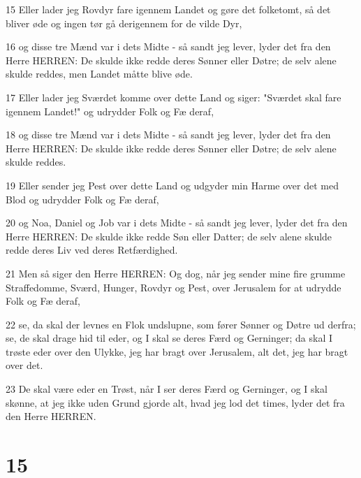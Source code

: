 \par 15 Eller lader jeg Rovdyr fare igennem Landet og gøre det folketomt, så det bliver øde og ingen tør gå derigennem for de vilde Dyr,
\par 16 og disse tre Mænd var i dets Midte - så sandt jeg lever, lyder det fra den Herre HERREN: De skulde ikke redde deres Sønner eller Døtre; de selv alene skulde reddes, men Landet måtte blive øde.
\par 17 Eller lader jeg Sværdet komme over dette Land og siger: "Sværdet skal fare igennem Landet!" og udrydder Folk og Fæ deraf,
\par 18 og disse tre Mænd var i dets Midte - så sandt jeg lever, lyder det fra den Herre HERREN: De skulde ikke redde deres Sønner eller Døtre; de selv alene skulde reddes.
\par 19 Eller sender jeg Pest over dette Land og udgyder min Harme over det med Blod og udrydder Folk og Fæ deraf,
\par 20 og Noa, Daniel og Job var i dets Midte - så sandt jeg lever, lyder det fra den Herre HERREN: De skulde ikke redde Søn eller Datter; de selv alene skulde redde deres Liv ved deres Retfærdighed.
\par 21 Men så siger den Herre HERREN: Og dog, når jeg sender mine fire grumme Straffedomme, Sværd, Hunger, Rovdyr og Pest, over Jerusalem for at udrydde Folk og Fæ deraf,
\par 22 se, da skal der levnes en Flok undslupne, som fører Sønner og Døtre ud derfra; se, de skal drage hid til eder, og I skal se deres Færd og Gerninger; da skal I trøste eder over den Ulykke, jeg har bragt over Jerusalem, alt det, jeg har bragt over det.
\par 23 De skal være eder en Trøst, når I ser deres Færd og Gerninger, og I skal skønne, at jeg ikke uden Grund gjorde alt, hvad jeg lod det times, lyder det fra den Herre HERREN.

\chapter{15}

